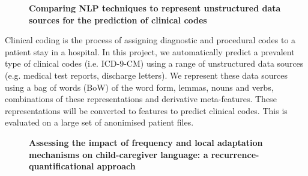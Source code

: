 \documentclass[10pt, a4paper, twopage, headinclude, footinclude, BCOR5mm]{scrartcl}
\begin{document}
\newpage

\begin{figure}[t!]
\centering
\large\textbf{Comparing NLP techniques to represent unstructured data sources for the prediction of clinical codes}
\vspace*{0.5cm}
\end{figure}


        \begin{table}[t!]
    \end{table}
        \begin{table}[t!]
    \end{table}

\noindent
Clinical coding is the process of assigning diagnostic and procedural codes to a patient stay in a hospital. In this project, we automatically predict a prevalent type of clinical codes (i.e. ICD-9-CM) using a range of unstructured data sources (e.g. medical test reports, discharge letters). We represent these data sources using a bag of words (BoW) of the word form, lemmas, nouns and verbs, combinations of these representations and derivative meta-features. These representations will be converted to features to predict clinical codes. This is evaluated on a large set of anonimised patient files.


\newpage

\begin{figure}[t!]
\centering
\large\textbf{Assessing the impact of frequency and local adaptation mechanisms on child-caregiver language: a recurrence-quantificational approach}
\vspace*{0.5cm}
\end{figure}
\end{document}
